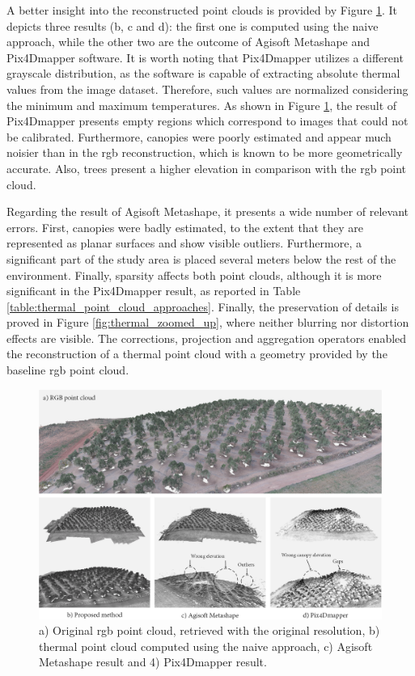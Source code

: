 A better insight into the reconstructed point clouds is provided by Figure \ref{fig:thermal_point_cloud_comparison}. It depicts three results (b, c and d): the first one is computed using the naive approach, while the other two are the outcome of Agisoft Metashape and Pix4Dmapper software. It is worth noting that Pix4Dmapper utilizes a different grayscale distribution, as the software is capable of extracting absolute thermal values from the image dataset. Therefore, such values are normalized considering the minimum and maximum temperatures. As shown in Figure \ref{fig:thermal_point_cloud_comparison}, the result of Pix4Dmapper presents empty regions which correspond to images that could not be calibrated. Furthermore, canopies were poorly estimated and appear much noisier than in the \acrshort{rgb} reconstruction, which is
known to be more geometrically accurate. Also, trees present a higher elevation in comparison with the \acrshort{rgb} point cloud. 

Regarding the result of Agisoft Metashape, it presents a wide number of relevant errors. First, canopies were badly estimated, to the extent that they are represented as planar surfaces and show visible outliers. Furthermore, a significant part of the study area is placed several meters below the rest of the environment. Finally, sparsity affects both point clouds, although it is more significant in the Pix4Dmapper result, as reported in Table \ref{table:thermal_point_cloud_approaches}. Finally, the preservation of details is proved in Figure \ref{fig:thermal_zoomed_up}, where neither blurring nor distortion effects are visible. The corrections, projection and aggregation operators enabled the reconstruction of a thermal point cloud with a geometry provided by the baseline \acrshort{rgb} point cloud.

\begin{figure}[hbt]
    \centering
    \includegraphics[width=.87\linewidth]{figs/thermal_projection/thermal_visualization_comparison.png}
	\caption{a) Original \acrshort{rgb} point cloud, retrieved with the original resolution, b) thermal point cloud computed using the naive approach, c) Agisoft Metashape result and 4) Pix4Dmapper result. }
	\label{fig:thermal_point_cloud_comparison}
\end{figure}

